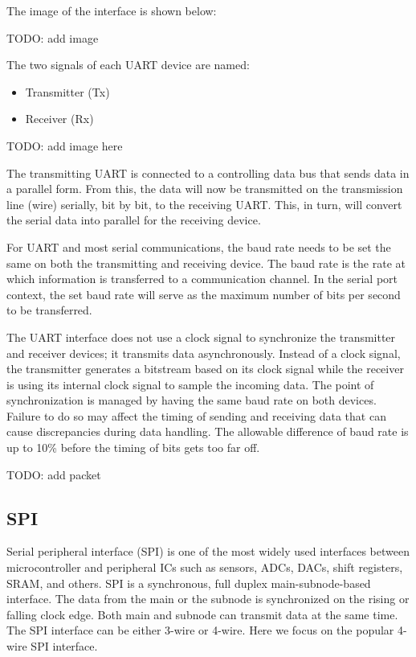 \documentclass[a4paper,12pt]{report}
\begin{document}
The image of the interface is shown below:

TODO: add image

The two signals of each UART device are named:

\begin{itemize}
  \item Transmitter (Tx)
  \item Receiver (Rx)
\end{itemize}

TODO: add image here

The transmitting UART is connected to a controlling data bus that
sends data in a parallel form.
From this,
the data will now be transmitted on the transmission line (wire) serially,
bit by bit, to the receiving UART.
This, in turn,
will convert the serial data into parallel for the receiving device.

For UART and most serial communications,
the baud rate needs to be set the same on both
the transmitting and receiving device.
The baud rate is the rate at which information is transferred
to a communication channel.
In the serial port context,
the set baud rate will serve as the maximum number of
bits per second to be transferred.

The UART interface does not use a clock signal to
synchronize the transmitter and receiver devices;
it transmits data asynchronously.
Instead of a clock signal,
the transmitter generates a bitstream based on its clock signal
while the receiver is using its internal clock signal
to sample the incoming data.
The point of synchronization is managed by having the same baud rate
on both devices.
Failure to do so may affect the timing of sending and receiving
data that can cause discrepancies during data handling.
The allowable difference of baud rate is up to 10\%
before the timing of bits gets too far off.

TODO: add packet

\subsection{SPI}

Serial peripheral interface (SPI)
is one of the most widely used interfaces between
microcontroller and peripheral ICs such as
sensors, ADCs, DACs, shift registers, SRAM, and others.
SPI is a synchronous, full duplex main-subnode-based interface.
The data from the main or the subnode is synchronized on the
rising or falling clock edge.
Both main and subnode can transmit data at the same time.
The SPI interface can be either 3-wire or 4-wire.
Here we focus on the popular 4-wire SPI interface.
\end{document}
